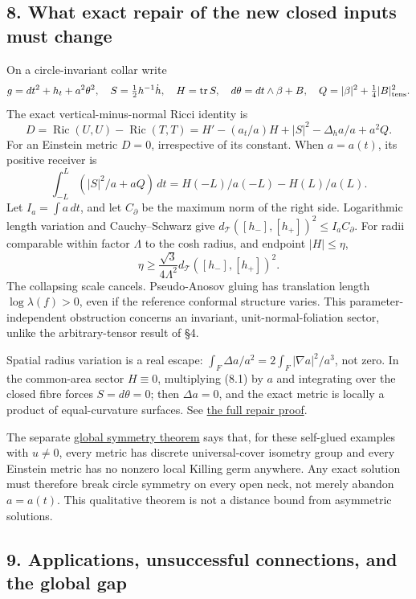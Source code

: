 \documentclass[
  english,
]{article}
\begin{document}
\hypertarget{what-exact-repair-of-the-new-closed-inputs-must-change}{%
\subsection{8. What exact repair of the new closed inputs must
change}\label{what-exact-repair-of-the-new-closed-inputs-must-change}}

On a circle-invariant collar write \[
g=dt^2+h_t+a^2\theta^2,\quad S=\tfrac12h^{-1}\dot h,\quad H=\operatorname{tr}S,
\quad d\theta=dt\wedge\beta+B,\quad Q=|\beta|^2+\tfrac14|B|_{\rm tens}^2.
\] The exact vertical-minus-normal Ricci identity is \[
D=\operatorname{Ric}(U,U)-\operatorname{Ric}(T,T)
=H'-(a_t/a)H+|S|^2-\Delta_ha/a+a^2Q.
\tag{8.1}
\] For an Einstein metric \(D=0\), irrespective of its constant. When
\(a=a(t)\), its positive receiver is \[
\int_{-L}^L(|S|^2/a+aQ)\,dt=H(-L)/a(-L)-H(L)/a(L).
\tag{8.2}
\] Let \(I_a=\int a\,dt\), and let \(C_\partial\) be the maximum norm of
the right side. Logarithmic length variation and Cauchy--Schwarz give
\(d_{\mathcal T}([h_-],[h_+])^2\le I_aC_\partial\). For radii comparable
within factor \(\Lambda\) to the cosh radius, and endpoint
\(|H|\le\eta\), \[
\eta\ge\frac{\sqrt3}{4\Lambda^2}d_{\mathcal T}([h_-],[h_+])^2.
\tag{8.3}
\] The collapsing scale cancels. Pseudo-Anosov gluing has translation
length \(\log\lambda(f)>0\), even if the reference conformal structure
varies. This parameter-independent obstruction concerns an invariant,
unit-normal-foliation sector, unlike the arbitrary-tensor result of §4.

Spatial radius variation is a real escape:
\(\int_F\Delta a/a^2=2\int_F|\nabla a|^2/a^3\), not zero. In the
common-area sector \(H\equiv0\), multiplying (8.1) by \(a\) and
integrating over the closed fibre forces \(S=d\theta=0\); then
\(\Delta a=0\), and the exact metric is locally a product of
equal-curvature surfaces. See \href{../proofs/round12_repair.md}{the
full repair proof}.

The separate \href{../proofs/round12_symmetry.md}{global symmetry
theorem} says that, for these self-glued examples with \(u\ne0\), every
metric has discrete universal-cover isometry group and every Einstein
metric has no nonzero local Killing germ anywhere. Any exact solution
must therefore break circle symmetry on every open neck, not merely
abandon \(a=a(t)\). This qualitative theorem is not a distance bound
from asymmetric solutions.

\hypertarget{applications-unsuccessful-connections-and-the-global-gap}{%
\subsection{9. Applications, unsuccessful connections, and the global
gap}\label{applications-unsuccessful-connections-and-the-global-gap}}
\end{document}
